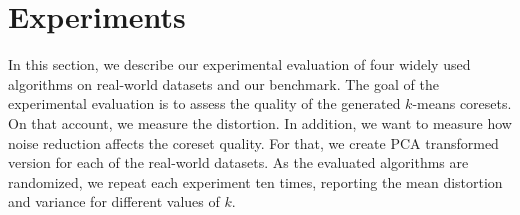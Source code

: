 \section{Experiments} \label{sec:experiments}
In this section, we describe our experimental evaluation of four widely used algorithms on real-world datasets and our benchmark. The goal of the experimental evaluation is to assess the quality of the generated $k$-means coresets. On that account, we measure the distortion. In addition, we want to measure how noise reduction affects the coreset quality. For that, we create PCA transformed version for each of the real-world datasets. As the evaluated algorithms are randomized, we repeat each experiment ten times, reporting the mean distortion and variance for different values of $k$.
